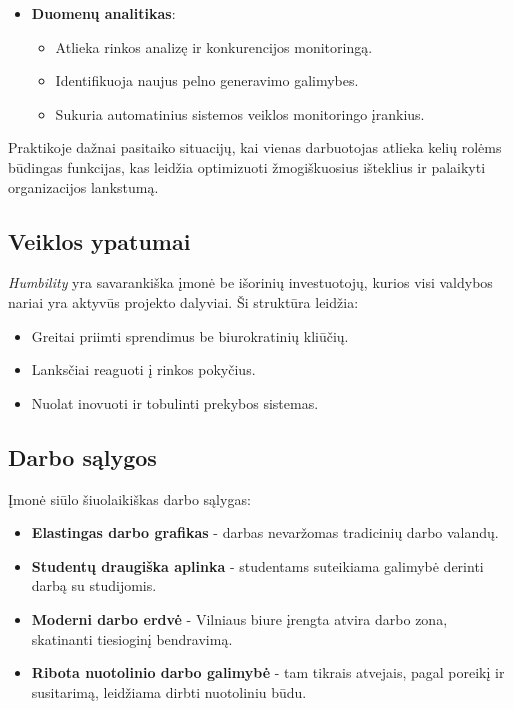 \documentclass[]{VUMIFTemplateClass}
\begin{document}
\begin{itemize}
\item \textbf{Duomenų analitikas}:
\begin{itemize}
\item Atlieka rinkos analizę ir konkurencijos monitoringą.
\item Identifikuoja naujus pelno generavimo galimybes.
\item Sukuria automatinius sistemos veiklos monitoringo įrankius.
\end{itemize}

\end{itemize}

Praktikoje dažnai pasitaiko situacijų, kai vienas darbuotojas atlieka kelių rolėms būdingas funkcijas, kas leidžia optimizuoti žmogiškuosius išteklius ir palaikyti organizacijos lankstumą.

\subsection{Veiklos ypatumai}
\textit{Humbility} yra savarankiška įmonė be išorinių investuotojų, kurios visi valdybos nariai yra aktyvūs projekto dalyviai. Ši struktūra leidžia:
\begin{itemize}
\item Greitai priimti sprendimus be biurokratinių kliūčių.
\item Lanksčiai reaguoti į rinkos pokyčius.
\item Nuolat inovuoti ir tobulinti prekybos sistemas.
\end{itemize}

\subsection{Darbo sąlygos}
Įmonė siūlo šiuolaikiškas darbo sąlygas:
\begin{itemize}
\item \textbf{Elastingas darbo grafikas} - darbas nevaržomas tradicinių darbo valandų.
\item \textbf{Studentų draugiška aplinka} - studentams suteikiama galimybė derinti darbą su studijomis.
\item \textbf{Moderni darbo erdvė} - Vilniaus biure įrengta atvira darbo zona, skatinanti tiesioginį bendravimą.
\item \textbf{Ribota nuotolinio darbo galimybė} - tam tikrais atvejais, pagal poreikį ir susitarimą, leidžiama dirbti nuotoliniu būdu.
\end{itemize}

\end{document}
